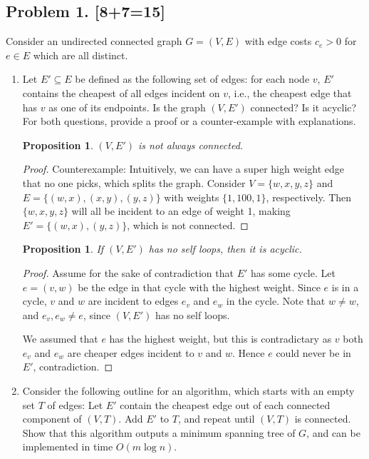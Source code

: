 \documentclass[10pt]{article}
\newtheorem{proposition}[lemma]{Proposition}
\begin{document}
\newpage

\subsection*{Problem 1. [8+7=15]}

Consider an undirected connected graph $G=(V,E)$ with edge costs $c_e > 0$ for $e \in E$ which are all distinct.
  
\begin{enumerate}
\item Let $E' \subseteq E$ be defined as the following set of edges: for each node $v$, $E'$ contains the cheapest of all edges incident on $v$, i.e., the cheapest edge that has $v$ as one of its endpoints. Is the graph $(V,E')$ connected? Is it acyclic? For both questions, provide a proof or a counter-example with explanations.

\begin{proposition}
  \((V, E')\) is not always connected.
\end{proposition}

\begin{proof}
  Counterexample: Intuitively, we can have a super high weight edge that no one picks, which splits the graph. Consider \(V = \{w, x, y, z\}\) and \(E = \{(w, x), (x, y), (y, z)\}\) with weights \(\{1, 100, 1\}\),
  respectively. Then \(\{w, x, y, z\}\) will all be incident to an edge of weight 1, making \(E' = \{(w, x), (y, z)\}\), which is not connected.
\end{proof}

\begin{proposition}
  If \((V, E')\) has no self loops, then it is acyclic.
\end{proposition}

\begin{proof}
  Assume for the sake of contradiction that \(E'\) has some cycle. Let \(e = (v, w)\) be the edge in that cycle with the highest weight. Since \(e\) is in a cycle, \(v\) and \(w\) are incident to edges \(e_v\) and \(e_w\) in the cycle. Note that \(w \neq w\), and \(e_v, e_w \neq e\), since \((V, E')\) has no self loops. 

  We assumed that \(e\) has the highest weight, but this is contradictary as \(v\) both \(e_v\) and \(e_w\) are cheaper edges incident to \(v\) and \(w\). Hence \(e\) could never be in \(E'\), contradiction.  
\end{proof}

\item Consider the following outline for an algorithm, which starts with an empty set $T$ of edges: Let $E'$ contain the cheapest edge out of each connected component of $(V,T)$. Add $E'$ to $T$, and repeat until $(V,T)$ is connected. Show that this algorithm outputs a minimum spanning tree of $G$, and can be implemented in time $O(m \log n)$. 
  

\end{enumerate}
\end{document}
